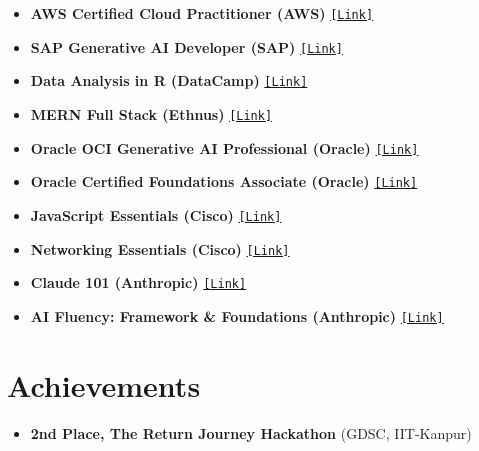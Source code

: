 \documentclass[11pt]{article}
\begin{document}
\begin{itemize}[leftmargin=*]
    \item \textbf{AWS Certified Cloud Practitioner (AWS)} \hfill \href{https://github.com/primetree2/cisco-certificate/blob/main/AWS\%20Certified\%20Cloud\%20Practitioner\%20certificate.pdf}{\texttt{[Link]}}
    \item \textbf{SAP Generative AI Developer (SAP)} \hfill \href{https://github.com/primetree2/cisco-certificate/blob/main/SAP_LA_AIG02_EN_11_EX.pdf}{\texttt{[Link]}}
    \item \textbf{Data Analysis in R (DataCamp)} \hfill \href{https://github.com/primetree2/cisco-certificate/blob/main/certificate\%20(1)_merged.pdf}{\texttt{[Link]}}
    \item \textbf{MERN Full Stack (Ethnus)} \hfill \href{https://github.com/primetree2/cisco-certificate/blob/main/3G3GLRGN.pdf}{\texttt{[Link]}}
    \item \textbf{Oracle OCI Generative AI Professional (Oracle)} \hfill \href{https://github.com/primetree2/cisco-certificate/blob/main/eCertificate.pdf}{\texttt{[Link]}}
    \item \textbf{Oracle Certified Foundations Associate (Oracle)} \hfill \href{https://github.com/primetree2/cisco-certificate/blob/main/oracle.pdf}{\texttt{[Link]}}
    \item \textbf{JavaScript Essentials (Cisco)} \hfill \href{https://github.com/primetree2/cisco-certificate/blob/main/22BCE7591_AP2023246000888_DA02.pdf}{\texttt{[Link]}}
    \item \textbf{Networking Essentials (Cisco)} \hfill \href{https://github.com/primetree2/cisco-certificate/blob/main/cisco\%20networking\%20essectials.pdf}{\texttt{[Link]}}
    \item \textbf{Claude 101 (Anthropic)} \hfill \href{https://verify.skilljar.com/c/ciebgmmxzm2d}{\texttt{[Link]}}
    \item \textbf{AI Fluency: Framework \& Foundations (Anthropic)} \hfill \href{https://verify.skilljar.com/c/8ezigsab3hki}{\texttt{[Link]}}
\end{itemize}



\section*{Achievements}
\begin{itemize}
    \item\textbf{2nd Place, The Return Journey Hackathon} (GDSC, IIT-Kanpur)
\end{itemize}
\end{document}
